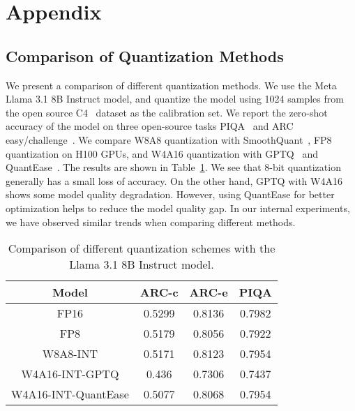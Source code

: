 \section{Appendix}
\subsection{Comparison of Quantization Methods}\label{appendix:quantization}


We present a comparison of different quantization methods. We use the Meta Llama 3.1 8B Instruct model, and quantize the model using 1024 samples from the open source C4~\cite{raffel2020exploring} dataset as the calibration set. We report the zero-shot accuracy of the model on three open-source tasks PIQA~\cite{piqa} and ARC easy/challenge~\cite{arc}. We compare W8A8 quantization with SmoothQuant~\cite{smoothquant}, FP8 quantization on H100 GPUs, and W4A16 quantization with GPTQ~\cite{frantar2022gptq} and QuantEase~\cite{behdin2023quantease}.
The results are shown in Table~\ref{table:quantization-accuracy}. We see that 8-bit quantization generally has a small loss of accuracy. On the other hand, GPTQ with W4A16 shows some model quality degradation. However, using QuantEase for better optimization helps to reduce the model quality gap. In our internal experiments, we have observed similar trends when comparing different methods.


\begin{table}[]
\begin{tabular}{cccc}
\hline \hline
Model & ARC-c & ARC-e & PIQA \\ \hline \hline
FP16    & 0.5299   &     0.8136      &    0.7982   \\
FP8    &  0.5179  &     0.8056      &    0.7922      \\
W8A8-INT    &  0.5171  &     0.8123      &     0.7954      \\
W4A16-INT-GPTQ    &   0.436 &      0.7306     &      0.7437    \\
W4A16-INT-QuantEase    & 0.5077   &         0.8068  &      0.7954     \\
\hline \hline
\end{tabular}
\caption{Comparison of different quantization schemes with the Llama 3.1 8B Instruct model.}
\label{table:quantization-accuracy}
\end{table}


